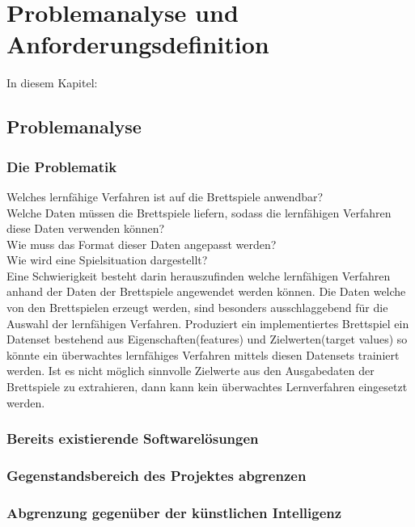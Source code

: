 \chapter{Problemanalyse und Anforderungsdefinition}
\label{cha:pua}

In diesem Kapitel: 
\section{Problemanalyse}

\subsection{Die Problematik}
Welches lernfähige Verfahren ist auf die Brettspiele anwendbar? \\
Welche Daten müssen die Brettspiele liefern, sodass die lernfähigen Verfahren diese Daten verwenden können? \\
Wie muss das Format dieser Daten angepasst werden? \\
Wie wird eine Spielsituation dargestellt? \\

Eine Schwierigkeit besteht darin herauszufinden welche lernfähigen Verfahren anhand der Daten der Brettspiele angewendet werden können. Die Daten welche von den Brettspielen erzeugt werden, sind besonders ausschlaggebend für die Auswahl der lernfähigen Verfahren. Produziert ein implementiertes Brettspiel ein Datenset bestehend aus Eigenschaften(features) und Zielwerten(target values) so könnte ein überwachtes lernfähiges Verfahren mittels diesen Datensets trainiert werden. Ist es nicht möglich sinnvolle Zielwerte aus den Ausgabedaten der Brettspiele zu extrahieren, dann kann kein überwachtes Lernverfahren eingesetzt werden. 
\subsection{Bereits existierende Softwarelösungen}

\subsection{Gegenstandsbereich des Projektes abgrenzen}

\subsection{Abgrenzung gegenüber der künstlichen Intelligenz}

